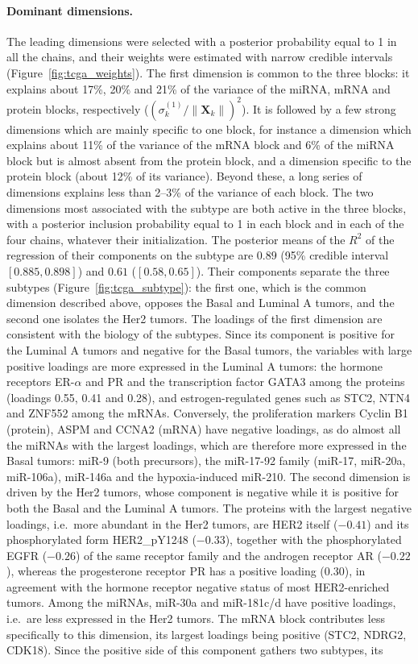\documentclass[11pt]{article}
\newcommand{\X}{\mathbf{X}}
\begin{document}
\paragraph{Dominant dimensions.} The leading dimensions were selected with a posterior probability equal to 1 in all the chains, and their weights were estimated with narrow credible intervals (Figure~\ref{fig:tcga_weights}). The first dimension is common to the three blocks: it explains about 17\%, 20\% and 21\% of the variance of the miRNA, mRNA and protein blocks, respectively ($(\sigma_k^{(1)}/\|\X_k\|)^2$). It is followed by a few strong dimensions which are mainly specific to one block, for instance a dimension which explains about 11\% of the variance of the mRNA block and 6\% of the miRNA block but is almost absent from the protein block, and a dimension specific to the protein block (about 12\% of its variance). Beyond these, a long series of dimensions explains less than 2--3\% of the variance of each block. The two dimensions most associated with the subtype are both active in the three blocks, with a posterior inclusion probability equal to 1 in each block and in each of the four chains, whatever their initialization. The posterior means of the $R^2$ of the regression of their components on the subtype are $0.89$ (95\% credible interval $[0.885,0.898]$) and $0.61$ ($[0.58,0.65]$). Their components separate the three subtypes (Figure~\ref{fig:tcga_subtype}): the first one, which is the common dimension described above, opposes the Basal and Luminal A tumors, and the second one isolates the Her2 tumors. The loadings of the first dimension are consistent with the biology of the subtypes. Since its component is positive for the Luminal A tumors and negative for the Basal tumors, the variables with large positive loadings are more expressed in the Luminal A tumors: the hormone receptors ER-$\alpha$ and PR and the transcription factor GATA3 among the proteins (loadings 0.55, 0.41 and 0.28), and estrogen-regulated genes such as STC2, NTN4 and ZNF552 among the mRNAs. Conversely, the proliferation markers Cyclin B1 (protein), ASPM and CCNA2 (mRNA) have negative loadings, as do almost all the miRNAs with the largest loadings, which are therefore more expressed in the Basal tumors: miR-9 (both precursors), the miR-17-92 family (miR-17, miR-20a, miR-106a), miR-146a and the hypoxia-induced miR-210. The second dimension is driven by the Her2 tumors, whose component is negative while it is positive for both the Basal and the Luminal A tumors. The proteins with the largest negative loadings, i.e.\ more abundant in the Her2 tumors, are HER2 itself ($-0.41$) and its phosphorylated form HER2\_pY1248 ($-0.33$), together with the phosphorylated EGFR ($-0.26$) of the same receptor family and the androgen receptor AR ($-0.22$), whereas the progesterone receptor PR has a positive loading ($0.30$), in agreement with the hormone receptor negative status of most HER2-enriched tumors. Among the miRNAs, miR-30a and miR-181c/d have positive loadings, i.e.\ are less expressed in the Her2 tumors. The mRNA block contributes less specifically to this dimension, its largest loadings being positive (STC2, NDRG2, CDK18). Since the positive side of this component gathers two subtypes, its 
\end{document}
